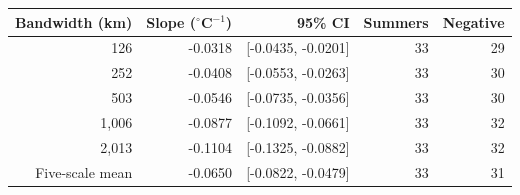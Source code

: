 \begin{tabular}{rrrrr}
\toprule
Bandwidth (km) & Slope ($^\circ$C$^{-1}$) & 95\% CI & Summers & Negative \\
\midrule
126 & -0.0318 & [-0.0435, -0.0201] & 33 & 29 \\
252 & -0.0408 & [-0.0553, -0.0263] & 33 & 30 \\
503 & -0.0546 & [-0.0735, -0.0356] & 33 & 30 \\
1,006 & -0.0877 & [-0.1092, -0.0661] & 33 & 32 \\
2,013 & -0.1104 & [-0.1325, -0.0882] & 33 & 32 \\
\midrule
Five-scale mean & -0.0650 & [-0.0822, -0.0479] & 33 & 31 \\ 
\bottomrule
\end{tabular}
